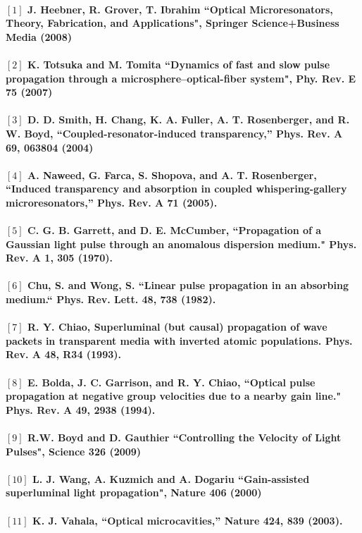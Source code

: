 \paragraph{\normalfont \large $[1]$ J. Heebner, R. Grover, T. Ibrahim “Optical Microresonators, Theory, Fabrication, and Applications", Springer Science+Business Media (2008)\\
\\ $[2]$ K. Totsuka and M. Tomita “Dynamics of fast and slow pulse propagation through a microsphere–optical-fiber system", Phy. Rev. E \textbf{75} (2007)\\
\\ $[3]$ D. D. Smith, H. Chang, K. A. Fuller, A. T. Rosenberger, and R. W. Boyd, “Coupled-resonator-induced
transparency,” Phys. Rev. A \textbf{69}, 063804 (2004)\\
\\ $[4]$ A. Naweed, G. Farca, S. Shopova, and A. T. Rosenberger, “Induced transparency and absorption in coupled
whispering-gallery microresonators,” Phys. Rev. A \textbf{71} (2005).\\
\\ $[5]$ C. G. B. Garrett, and D. E. McCumber, “Propagation of a Gaussian light pulse through an anomalous dispersion medium." Phys. Rev. A \textbf{1}, 305 (1970).\\
\\ $[6]$ Chu, S. and Wong, S. “Linear pulse propagation in an absorbing medium.“ Phys. Rev. Lett. \textbf{48}, 738
(1982).\\
\\ $[7]$ R. Y. Chiao, Superluminal (but causal) propagation of wave packets in transparent media with inverted atomic populations. Phys. Rev. A \textbf{48}, R34 (1993).\\
\\ $[8]$ E. Bolda, J. C. Garrison, and R. Y. Chiao, “Optical pulse propagation at negative group velocities due to a nearby gain line." Phys. Rev. A \textbf{49}, 2938 (1994).\\
\\ $[9]$ R.W. Boyd and D. Gauthier “Controlling the Velocity of Light Pulses", Science \textbf{326} (2009)\\
\\ $[10]$ L. J. Wang, A. Kuzmich and A. Dogariu “Gain-assisted superluminal light propagation", Nature \textbf{406} (2000)\\
\\ $[11]$ K. J. Vahala, “Optical microcavities,” Nature \textbf{424}, 839 (2003).\\
}
